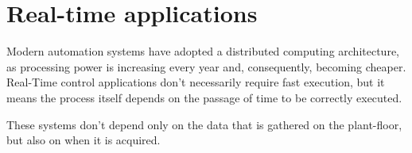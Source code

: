 \section{Real-time applications}

Modern automation systems have adopted a distributed computing architecture, as processing power is increasing every year and, consequently, becoming cheaper.
Real-Time control applications don't necessarily require fast execution, but it means the process itself depends on the passage of time to be correctly executed.

These systems don't depend only on the data that is gathered on the plant-floor, but also on when it is acquired.



